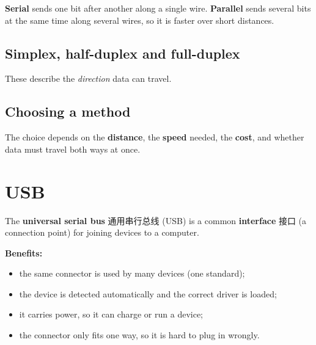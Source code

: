 \documentclass[11pt]{article}
\begin{document}
\textbf{Serial} sends one bit after another along a single wire. \textbf{Parallel} sends several bits at the same time along several wires, so it is faster over short distances.

\subsection*{Simplex, half-duplex and full-duplex}

These describe the \emph{direction} data can travel.

\begin{center}
\end{center}

\subsection*{Choosing a method}

The choice depends on the \textbf{distance}, the \textbf{speed} needed, the \textbf{cost}, and whether data must travel both ways at once.

\section*{USB}

The \textbf{universal serial bus} 通用串行总线 (USB) is a common \textbf{interface} 接口 (a connection point) for joining devices to a computer.

\textbf{Benefits:}

\begin{itemize}
\item the same connector is used by many devices (one standard);

\item the device is detected automatically and the correct driver is loaded;

\item it carries power, so it can charge or run a device;

\item the connector only fits one way, so it is hard to plug in wrongly.

\end{itemize}
\end{document}

